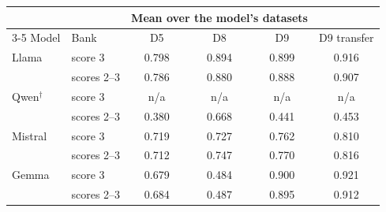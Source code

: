 \begin{tabular}{@{}ll cccc@{}}
\toprule
 & & \multicolumn{3}{c}{Mean over the model's datasets} & \\
\cmidrule(lr){3-5}
Model & Bank & D5 & D8 & D9 & D9 transfer \\
\midrule
Llama & score 3 & 0.798 & 0.894 & 0.899 & 0.916 \\
 & scores 2--3 & 0.786 & 0.880 & 0.888 & 0.907 \\
Qwen$^\dagger$ & score 3 & n/a & n/a & n/a & n/a \\
 & scores 2--3 & 0.380 & 0.668 & 0.441 & 0.453 \\
Mistral & score 3 & 0.719 & 0.727 & 0.762 & 0.810 \\
 & scores 2--3 & 0.712 & 0.747 & 0.770 & 0.816 \\
Gemma & score 3 & 0.679 & 0.484 & 0.900 & 0.921 \\
 & scores 2--3 & 0.684 & 0.487 & 0.895 & 0.912 \\
\bottomrule
\end{tabular}
